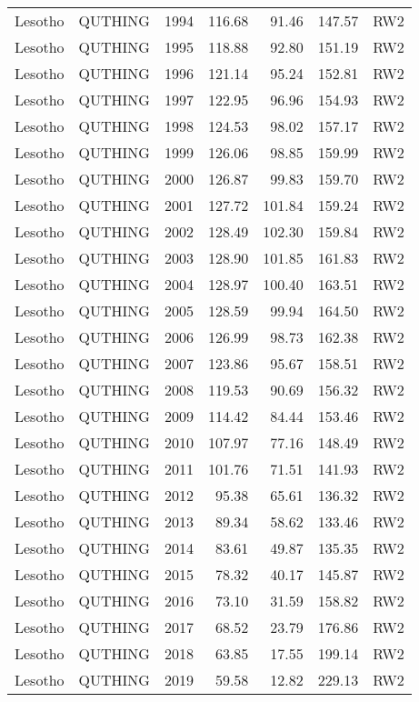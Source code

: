 \begin{longtable}{lllrrrl}
  Lesotho & QUTHING & 1994 & 116.68 & 91.46 & 147.57 & RW2 \\ 
  Lesotho & QUTHING & 1995 & 118.88 & 92.80 & 151.19 & RW2 \\ 
  Lesotho & QUTHING & 1996 & 121.14 & 95.24 & 152.81 & RW2 \\ 
  Lesotho & QUTHING & 1997 & 122.95 & 96.96 & 154.93 & RW2 \\ 
  Lesotho & QUTHING & 1998 & 124.53 & 98.02 & 157.17 & RW2 \\ 
  Lesotho & QUTHING & 1999 & 126.06 & 98.85 & 159.99 & RW2 \\ 
  Lesotho & QUTHING & 2000 & 126.87 & 99.83 & 159.70 & RW2 \\ 
  Lesotho & QUTHING & 2001 & 127.72 & 101.84 & 159.24 & RW2 \\ 
  Lesotho & QUTHING & 2002 & 128.49 & 102.30 & 159.84 & RW2 \\ 
  Lesotho & QUTHING & 2003 & 128.90 & 101.85 & 161.83 & RW2 \\ 
  Lesotho & QUTHING & 2004 & 128.97 & 100.40 & 163.51 & RW2 \\ 
  Lesotho & QUTHING & 2005 & 128.59 & 99.94 & 164.50 & RW2 \\ 
  Lesotho & QUTHING & 2006 & 126.99 & 98.73 & 162.38 & RW2 \\ 
  Lesotho & QUTHING & 2007 & 123.86 & 95.67 & 158.51 & RW2 \\ 
  Lesotho & QUTHING & 2008 & 119.53 & 90.69 & 156.32 & RW2 \\ 
  Lesotho & QUTHING & 2009 & 114.42 & 84.44 & 153.46 & RW2 \\ 
  Lesotho & QUTHING & 2010 & 107.97 & 77.16 & 148.49 & RW2 \\ 
  Lesotho & QUTHING & 2011 & 101.76 & 71.51 & 141.93 & RW2 \\ 
  Lesotho & QUTHING & 2012 & 95.38 & 65.61 & 136.32 & RW2 \\ 
  Lesotho & QUTHING & 2013 & 89.34 & 58.62 & 133.46 & RW2 \\ 
  Lesotho & QUTHING & 2014 & 83.61 & 49.87 & 135.35 & RW2 \\ 
  Lesotho & QUTHING & 2015 & 78.32 & 40.17 & 145.87 & RW2 \\ 
  Lesotho & QUTHING & 2016 & 73.10 & 31.59 & 158.82 & RW2 \\ 
  Lesotho & QUTHING & 2017 & 68.52 & 23.79 & 176.86 & RW2 \\ 
  Lesotho & QUTHING & 2018 & 63.85 & 17.55 & 199.14 & RW2 \\ 
  Lesotho & QUTHING & 2019 & 59.58 & 12.82 & 229.13 & RW2 \\ 

\end{longtable}
